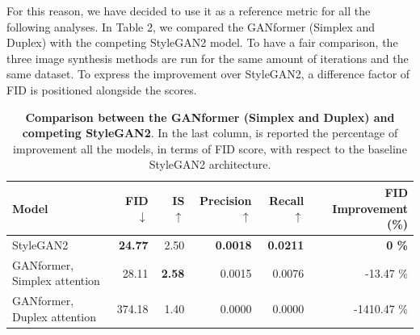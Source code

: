 \documentclass{article}
\begin{document}
	For this reason, we have decided to use it as a reference metric for all the following analyses. In 
	Table 2, we compared the GANformer (Simplex and Duplex) with the competing StyleGAN2 model. 
	To have a fair comparison, the three image synthesis methods are run for the same amount of 
	iterations and the same dataset. To express the improvement over StyleGAN2, a difference factor of 
	FID is positioned alongside the scores. 
	\begin{table}[htb]
		\centering
		\caption{\textbf{Comparison between the GANformer (Simplex and Duplex) and competing 
				StyleGAN2}. In the last column, is reported the percentage of improvement all the models, in 
			terms 
			of FID score, with respect to the baseline StyleGAN2 architecture.}
		\label{tab:our-results}
		\vspace{3mm}
		\small
		\begin{tabular}{l|rrrrr}
			\toprule
			\textbf{Model}  & \textbf{FID $\downarrow$}  & \textbf{IS $\uparrow$} & 
			\textbf{Precision$\uparrow$}  & \textbf{Recall $\uparrow$} & \textbf{FID Improvement (\%)}\\ 
			\midrule
			StyleGAN2                    &  \textbf{24.77} & 2.50 & \textbf{0.0018} & \textbf{0.0211} & \textbf{0 
			\%} \\ 
			GANformer, Simplex attention & 28.11 & \textbf{2.58} & 0.0015 & 0.0076 & -13.47 \%\\ 
			GANformer, Duplex attention  & 374.18 & 1.40 & 0.0000 & 0.0000 & -1410.47 \% \\ 
			\bottomrule
		\end{tabular}
	\end{table}
	
\end{document}
